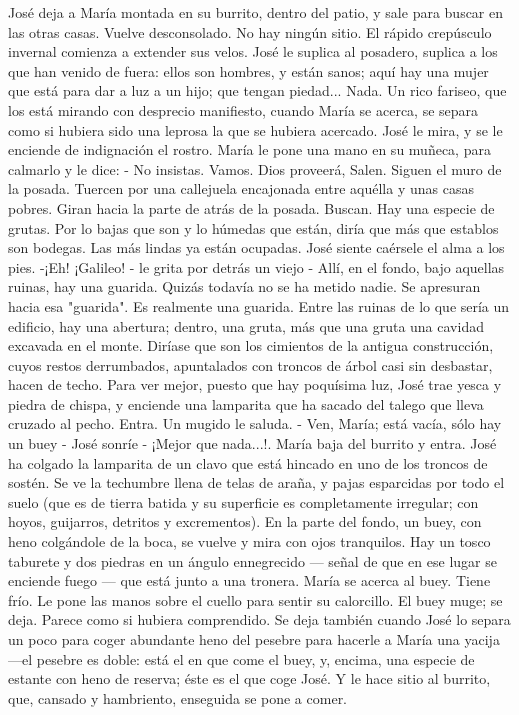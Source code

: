 \documentclass[12pt]{book} %
\begin{document}
José deja a María montada en su burrito, dentro del patio, y sale para buscar en las otras casas. Vuelve desconsolado. No hay ningún sitio. El rápido crepúsculo invernal comienza a extender sus velos. José le suplica al posadero, suplica a los que han venido de fuera: ellos son hombres, y están sanos; aquí hay una mujer que está para dar a luz a un hijo; que tengan piedad... Nada. 
Un rico fariseo, que los está mirando con desprecio manifiesto, cuando María se acerca, se separa como si hubiera sido 
una leprosa la que se hubiera acercado. José le mira, y se le enciende de indignación el rostro. María le pone una mano en su muñeca, para calmarlo y le dice: 
- No insistas. Vamos. Dios proveerá,         
Salen. Siguen el muro de la posada. Tuercen por una callejuela encajonada entre aquélla y unas casas pobres. Giran 
hacia la parte de atrás de la posada. Buscan. Hay una especie de grutas. Por lo bajas que son y lo húmedas que están, diría que más que establos son bodegas. Las más lindas ya están ocupadas. José siente caérsele el alma a los pies. 
-¡Eh! ¡Galileo! - le grita por detrás un viejo - Allí, en el fondo, bajo aquellas ruinas, hay una guarida. Quizás todavía no se 
ha metido nadie. 
Se apresuran hacia esa "guarida". Es realmente una guarida. Entre las ruinas de lo que sería un edificio, hay una abertura; dentro, una gruta, más que una gruta una cavidad excavada en el monte. 
Diríase que son los cimientos de la antigua construcción, cuyos restos derrumbados, apuntalados con troncos de árbol 
casi sin desbastar, hacen de techo. 
Para ver mejor, puesto que hay poquísima luz, José trae yesca y piedra de chispa, y enciende una lamparita que ha 
sacado del talego que lleva cruzado al pecho. Entra. Un mugido le saluda. 
- Ven, María; está vacía, sólo hay un buey - José sonríe - ¡Mejor que nada...!. 
María baja del burrito y entra. 
José ha colgado la lamparita de un clavo que está hincado en uno de los troncos de sostén. Se ve la techumbre llena de 
telas de araña, y pajas esparcidas por todo el suelo (que es de tierra batida y su superficie es completamente irregular; con hoyos, guijarros, detritos y excrementos). En la parte del fondo, un buey, con heno colgándole de la boca, se vuelve y mira con ojos tranquilos. Hay un tosco taburete y dos piedras en un ángulo ennegrecido — señal de que en ese lugar se enciende fuego — que está junto a una tronera. 
María se acerca al buey. Tiene frío. Le pone las manos sobre el cuello para sentir su calorcillo. El buey muge; se deja. Parece como si hubiera comprendido. Se deja también cuando José lo separa un poco para coger abundante heno del pesebre para hacerle a María una yacija—el pesebre es doble: está el en que come el buey, y, encima, una especie de estante con heno de reserva; éste es el que coge José. Y le hace sitio al burrito, que, cansado y hambriento, enseguida se pone a comer. 
\end{document}
